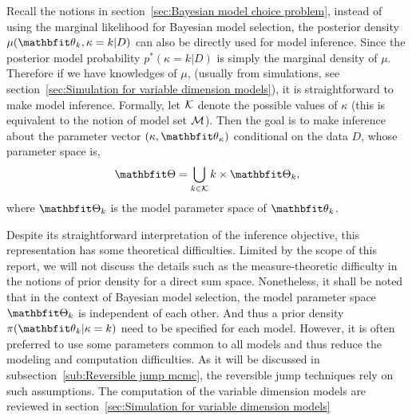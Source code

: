 Recall the notions in section~\ref{sec:Bayesian model choice problem}, instead
of using the marginal likelihood for Bayesian model selection, the posterior
density $\mu(\bth_k,\kappa=k|D)$ can also be directly used for model
inference. Since the posterior model probability $p^*(\kappa=k|D)$ is simply
the marginal density of $\mu$. Therefore if we have knowledges of $\mu$,
(usually from simulations, see section~\ref{sec:Simulation for variable
  dimension models}), it is straightforward to make model inference. Formally,
let $\mathcal{K}$ denote the possible values of $\kappa$ (this is equivalent to the
notion of model set $\mathcal{M}$). Then the goal is to make inference about the
parameter vector $(\kappa, \bth_{\kappa})$ conditional on the data $D$, whose
parameter space is,
\begin{equation}
  \bTh = \bigcup_{k\in\calK}{k}\times\bTh_k,
  \label{eq:variable dimension parameter space}
\end{equation}
where $\bTh_k$ is the model parameter space of $\bth_k$.

Despite its straightforward interpretation of the inference objective, this
representation has some theoretical difficulties. Limited by the scope of this
report, we will not discuss the details such as the measure-theoretic
difficulty in the notions of prior density for a direct sum space.
Nonetheless, it shall be noted that in the context of Bayesian model
selection, the model parameter space $\bTh_k$ is independent of each other.
And thus a prior density $\pi(\bth_k|\kappa =k)$ need to be specified for each
model. However, it is often preferred to use some parameters common to all
models and thus reduce the modeling and computation difficulties. As it will
be discussed in subsection~\ref{sub:Reversible jump mcmc}, the reversible jump
\mcmc techniques rely on such assumptions. The computation of the variable
dimension models are reviewed in section~\ref{sec:Simulation for variable
  dimension models}
